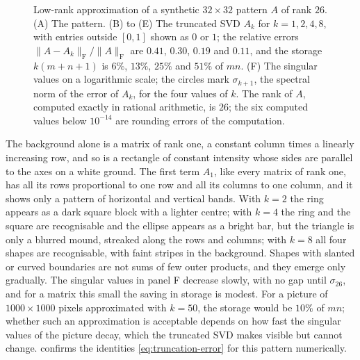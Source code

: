 \begin{figure}
\hfill
{}\hfill
{}
\sdpanelrow
{}\hfill
{}\hfill
{}
\caption{Low-rank approximation of a synthetic $32\times32$ pattern $A$ of rank $26$. (A) The pattern. (B) to (E) The truncated SVD $A_k$ for $k=1,2,4,8$, with entries outside $[0,1]$ shown as $0$ or $1$; the relative errors $\|A-A_k\|_{\mathrm F}/\|A\|_{\mathrm F}$ are $0.41$, $0.30$, $0.19$ and $0.11$, and the storage $k(m+n+1)$ is $6\%$, $13\%$, $25\%$ and $51\%$ of $mn$. (F) The singular values on a logarithmic scale; the circles mark $\sigma_{k+1}$, the spectral norm of the error of $A_k$, for the four values of $k$. The rank of $A$, computed exactly in rational arithmetic, is $26$; the six computed values below $10^{-14}$ are rounding errors of the computation.\label{fig:low-rank-pattern}}
\end{figure}

The background alone is a matrix of rank one, a constant column times a linearly increasing row, and so is a rectangle of constant intensity whose sides are parallel to the axes on a white ground. The first term $A_1$, like every matrix of rank one, has all its rows proportional to one row and all its columns to one column, and it shows only a pattern of horizontal and vertical bands. With $k=2$ the ring appears as a dark square block with a lighter centre; with $k=4$ the ring and the square are recognisable and the ellipse appears as a bright bar, but the triangle is only a blurred mound, streaked along the rows and columns; with $k=8$ all four shapes are recognisable, with faint stripes in the background. Shapes with slanted or curved boundaries are not sums of few outer products, and they emerge only gradually. The singular values in panel F decrease slowly, with no gap until $\sigma_{26}$, and for a matrix this small the saving in storage is modest. For a picture of $1000\times1000$ pixels approximated with $k=50$, the storage would be $10\%$ of $mn$; whether such an approximation is acceptable depends on how fast the singular values of the picture decay, which the truncated SVD makes visible but cannot change.  confirms the identities \eqref{eq:truncation-error} for this pattern numerically.


